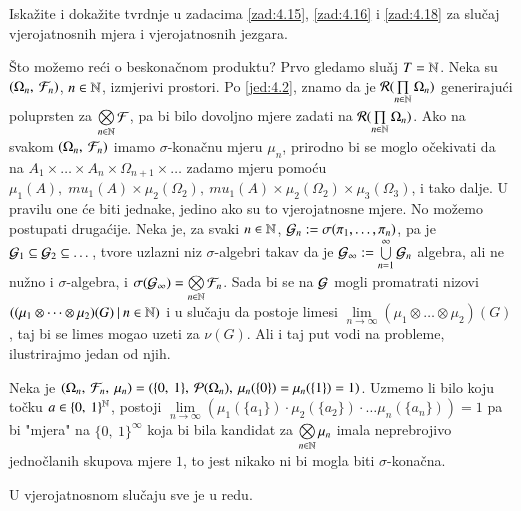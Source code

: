 \begin{zad} \label{zad:4.19}
    Iska\v zite i doka\v zite tvrdnje u zadacima \ref{zad:4.15}, \ref{zad:4.16} i \ref{zad:4.18} za slu\v caj vjerojatnosnih mjera i vjerojatnosnih jezgara.
\end{zad}

\v Sto mo\v zemo re\' ci o beskona\v cnom produktu?
Prvo gledamo slu\v aj $T = \mathbb{N}$. Neka su $({\Omega_n}, \: {\mathcal{F}_n})$, $n \in \mathbb{N}$, izmjerivi prostori. Po \eqref{jed:4.2}, znamo da je $\mathcal{R}({\prod\limits_{n \in \mathbb{N}}^{} \Omega_n})$ generiraju\' ci poluprsten za $\bigotimes\limits_{n \in \mathbb{N}}^{} \mathcal{F}$, pa bi bilo dovoljno mjere zadati na $\mathcal{R}({\prod\limits_{n \in \mathbb{N}}^{} \Omega_n})$.
Ako na svakom $({\Omega_n}, \: {\mathcal{F}_n})$ imamo $\sigma$-kona\v cnu mjeru $\mu_n$, prirodno bi se moglo o\v cekivati da na $A_1 \times \dots \times A_n \times \Omega_{n + 1} \times \dots$ zadamo mjeru pomo\' cu $\mu_1(A), \; mu_1(A) \times \mu_2(\Omega_2), \: mu_1(A) \times \mu_2(\Omega_2) \times \mu_3 (\Omega_3)$, i tako dalje.
U pravilu one \' ce biti jednake, jedino ako su to vjerojatnosne mjere.
No mo\v zemo postupati druga\' cije.
Neka je, za svaki $n \in \mathbb{N}$, $\mathcal{G}_n := \sigma({\pi_1, \dots, \pi_n})$, pa je $\mathcal{G}_1 \subseteq \mathcal{G}_2 \subseteq \dots$, tvore uzlazni niz $\sigma$-algebri takav da je $\mathcal{G}_{\infty} := \bigcup\limits_{n = 1}^{\infty} \mathcal{G}_n$ algebra, ali ne nu\v zno i $\sigma$-algebra, i $\sigma({\mathcal{G}_{\infty}}) = \bigotimes\limits_{n \in \mathbb{N}}^{} \mathcal{F}_n$.
Sada bi se na $\mathcal{G}$ mogli promatrati nizovi $({(\mu_1 \otimes \dots \otimes \mu_2)(G)} \: | \: {n \in \mathbb{N}})$ i u slu\v caju da postoje limesi $\lim\limits_{n \to \infty} (\mu_1 \otimes \dots \otimes \mu_2)(G)$, taj bi se limes mogao uzeti za $\nu (G)$.
Ali i taj put vodi na probleme, ilustrirajmo jedan od njih.

\begin{pr}  \label{pr:4.20}
    Neka je $(\Omega_n, \: \mathcal{F}_n, \: \mu_n) = (\{0, \: 1\}, \: \mathcal{P}({\Omega_n}), \: \mu_n(\{0\}) = \mu_n (\{1\}) = 1)$.
    Uzmemo li bilo koju to\v cku $a \in \{ 0, \: 1 \}^{\mathbb{N}}$, postoji $\lim\limits_{n \to \infty} (\mu_1 (\{ a_1 \}) \cdot \mu_2 (\{ a_2 \}) \cdot \dots \mu_n (\{ a_n \}) ) = 1$ pa bi "mjera" na $\{ 0, \: 1 \}^{\infty}$ koja bi bila kandidat za $\bigotimes\limits_{n \in \mathbb{N}}^{} \mu_n$ imala neprebrojivo jedno\v clanih skupova mjere $1$, to jest nikako ni bi mogla biti $\sigma$-kona\v cna. 
\end{pr}

U vjerojatnosnom slu\v caju sve je u redu.

